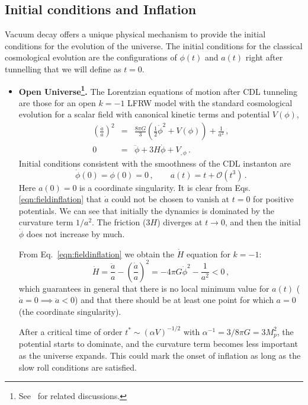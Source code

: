 \documentclass[a4paper,11pt]{article}
\numberwithin{equation}{section}
\begin{document}
\subsection*{Initial conditions and Inflation}
Vacuum decay offers a unique physical mechanism to provide the initial conditions for the evolution of the universe. The initial conditions for the classical cosmological evolution are the configurations of $\phi(t)$ and $a(t)$ right after tunnelling that we will define as  $t=0$.
\begin{itemize}
\item{\bf Open Universe\footnote{See~\cite{Gott:1982zf,Ratra:1994vw,Bucher:1994gb,Linde:1999wv,Freivogel:2005vv,Bousso:2013uia,Freivogel:2014hca,Bousso:2014jca} for related discussions.}.}
The Lorentzian equations of motion after CDL tunneling  are those for an open $k=-1$ LFRW model with the standard cosmological evolution for a scalar field with canonical kinetic terms and potential $V(\phi)$,
\begin{eqnarray}
 \left(\frac{\dot a}{a}\right)^2 & =&\frac{8\pi G}{3}\left(\frac{1}{2}\dot\phi^2+V(\phi)\right)+\frac{1}{a^2} \,, \\
0&=&\ddot{\phi}+3H\dot\phi  +V_{,\phi} \,. \nonumber
\label{eqn:fieldinflation}
\end{eqnarray}
Initial conditions consistent with the smoothness of the CDL instanton are 
\begin{equation}
\dot\phi(0)=\phi(0)=0 \,, \qquad  a(t)=t +{\mathcal O(t^3)} \,.\nonumber
\end{equation}
 Here $a(0)=0$ is a coordinate singularity. It is clear from Eqs. \eqref{eqn:fieldinflation} that $\dot a$ could not be chosen to vanish at $t=0$  for positive potentials. We can see that initially the dynamics is dominated by the curvature term $1/a^2$. The friction ($3H$) diverges at $t\to 0$, and then the initial $\dot\phi$ does not increase by much. 
 
From Eq.~\eqref{eqn:fieldinflation} we obtain the
 $\dot H$ equation for $k=-1$:
 \begin{equation}
 \dot H= \frac{\ddot a}{ a} -\left(\frac{\dot a}{a}\right)^2=-4\pi G \dot\phi^2 -\frac{1}{a^2} < 0 \,,
 \label{acceleration}
 \end{equation}
 which guarantees in general that there is no local minimum value for $a(t)$ ($\dot a=0 \implies \ddot a<0$) and that there should be at least one point for which $a=0$ (the coordinate singularity).
 
 After a critical time of order $t^*\sim (\alpha V)^{-1/2}$ with $\alpha^{-1}=3/8\pi G=3M_p^2$, the potential  starts to dominate, and the curvature term becomes less important as the universe expands.  This could mark the onset of inflation as long as the slow roll conditions are satisfied.


\end{itemize}
\end{document}
